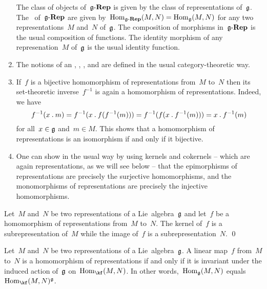 \begin{remark}
\begin{enumerate}
			The class of objects of~$\mathfrak{g}\text{-}\mathbf{Rep}$ is given by the class of representations of~$\mathfrak{g}$.
			The~\spaces{$\Hom$} of~$\mathfrak{g}\text{-}\mathbf{Rep}$ are given by~$\operatorname{Hom}_{\mathfrak{g}\text{-}\mathbf{Rep}}(M, N) = \operatorname{Hom}_{\mathfrak{g}}(M,N)$ for any two representations~$M$ and~$N$ of~$\mathfrak{g}$.
			The composition of morphisms in~$\mathfrak{g}\text{-}\mathbf{Rep}$ is the usual composition of functions.
			The identity morphism of any represenation~$M$ of~$\mathfrak{g}$ is the usual identity function.
		\item
			The notions of an , , ,  and  are defined in the usual category-theoretic way.
		\item
			If~$f$ is a bijective homomorphism of representations from~$M$ to~$N$ then its set-theoretic inverse~$f^{-1}$ is again a homomorphism of representations.
			Indeed, we have
			\[
				f^{-1}(x \mathbin{.} m)
				=
				f^{-1}(x \mathbin{.} f(f^{-1}(m)))
				=
				f^{-1}(f(x \mathbin{.} f^{-1}(m)))
				=
				x \mathbin{.} f^{-1}(m)
			\]
			for all~$x \in \mathfrak{g}$ and~$m \in M$.
			This shows that a homomorphism of representations is an isomorphism if and only if it bijective.
		\item
			One can show in the usual way by using kernels and cokernels -- which are again representations, as we will see below -- that the epimorphisms of representations are precisely the surjective homomorphisms, and the monomorphisms of representations are precisely the injective homomorphisms.
	\end{enumerate}
\end{remark}


\begin{lemma}
	Let~$M$ and~$N$ be two representations of a Lie~algebra~$\mathfrak{g}$ and let~$f$ be a homomorphism of representations from~$M$ to~$N$.
	The kernel of~$f$ is a subrepresentation of~$M$ while the image of~$f$ is a subrepresentation~$N$.
	\qed
\end{lemma}


\begin{proposition}
	\label{homomorphisms of representations as invariants}
	Let~$M$ and~$N$ be two representations of a Lie~algebra~$\mathfrak{g}$.
	A linear map~$f$ from~$M$ to~$N$ is a homomorphism of representations if and only if it is invariant under the induced action of~$\mathfrak{g}$ on~$\Hom_{\kf}(M,N)$.
	In other words,~$\operatorname{Hom}_{\mathfrak{g}}(M, N)$ equals~$\Hom_{\kf}(M,N)^{\glie}$.
\end{proposition}


